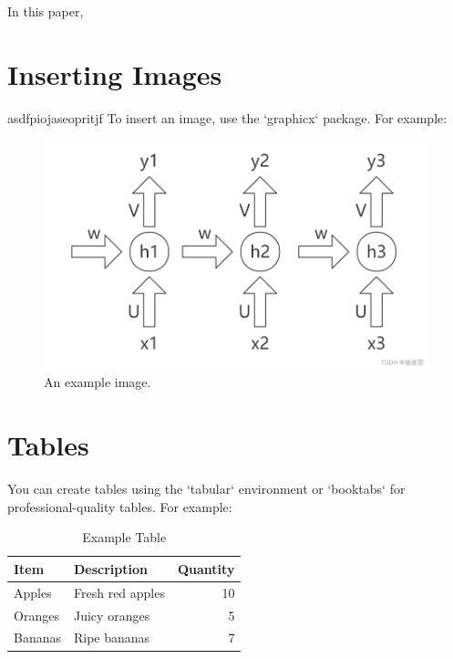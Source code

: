 \documentclass[12pt,a4paper]{article}
\begin{document}
In this paper, 


\printbibliography



\section{Inserting Images}
asdfpiojaseopritjf
To insert an image, use the `graphicx` package. For example:

\begin{figure}[!htb]
    \centering
    \includegraphics[width=1\textwidth]{../Pic/pic1.png} %
    \caption{An example image.}
    \label{fig:example}
\end{figure}

\section{Tables}
You can create tables using the `tabular` environment or `booktabs` for professional-quality tables. For example:

\begin{table}[h!]
\centering
\caption{Example Table}
\begin{tabular}{@{}llr@{}}
\toprule
\textbf{Item} & \textbf{Description} & \textbf{Quantity} \\ \midrule
Apples        & Fresh red apples     & 10                \\
Oranges       & Juicy oranges        & 5                 \\
Bananas       & Ripe bananas         & 7                 \\ \bottomrule
\end{tabular}
\label{tab:example}
\end{table}
\end{document}
